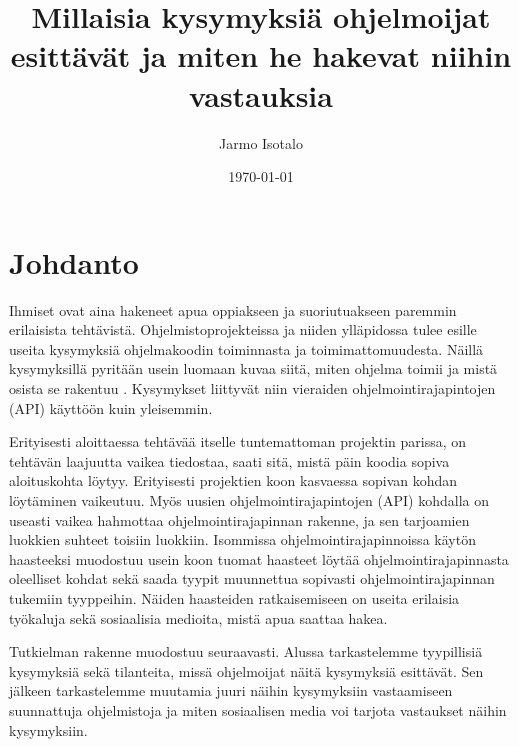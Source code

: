 \documentclass[finnish]{../tktltiki2}
\title{Millaisia kysymyksiä ohjelmoijat esittävät ja miten he hakevat niihin vastauksia}
\author{Jarmo Isotalo}
\date{\today}
\theoremstyle{definition}
\theoremstyle{remark}
\begin{document}

\frontmatter      %

\maketitle        %
\makeabstract     %

\tableofcontents  %


\mainmatter       %

\section{Johdanto}
Ihmiset ovat aina hakeneet apua oppiakseen ja suoriutuakseen paremmin erilaisista tehtävistä. %
Ohjelmistoprojekteissa ja niiden ylläpidossa tulee esille useita kysymyksiä ohjelmakoodin toiminnasta ja toimimattomuudesta. Näillä kysymyksillä pyritään usein luomaan kuvaa siitä, miten ohjelma toimii ja  mistä osista se rakentuu \cite{g_search_code, questions-during-software-evolution-tasks,asking-and-answering-api-questions}.
Kysymykset liittyvät niin vieraiden ohjelmointirajapintojen (API) käyttöön \cite{jungloid-mining} kuin yleisemmin.

Erityisesti aloittaessa tehtävää itselle tuntemattoman projektin parissa, on tehtävän laajuutta vaikea tiedostaa, saati sitä, mistä päin koodia sopiva aloituskohta löytyy. Erityisesti projektien koon kasvaessa sopivan kohdan löytäminen vaikeutuu.
Myös uusien ohjelmointirajapintojen (API) kohdalla on useasti vaikea hahmottaa ohjelmointirajapinnan rakenne, ja sen tarjoamien luokkien suhteet toisiin luokkiin. Isommissa ohjelmointirajapinnoissa käytön haasteeksi muodostuu usein koon tuomat haasteet löytää ohjelmointirajapinnasta oleelliset kohdat sekä saada tyypit muunnettua sopivasti ohjelmointirajapinnan tukemiin tyyppeihin.
Näiden haasteiden ratkaisemiseen on useita erilaisia työkaluja sekä sosiaalisia medioita, mistä apua saattaa hakea.

Tutkielman rakenne muodostuu seuraavasti. Alussa tarkastelemme tyypillisiä kysymyksiä sekä tilanteita, missä ohjelmoijat näitä kysymyksiä esittävät. Sen jälkeen tarkastelemme muutamia juuri näihin kysymyksiin vastaamiseen suunnattuja ohjelmistoja ja miten sosiaalisen media voi tarjota vastaukset näihin kysymyksiin.
\end{document}

